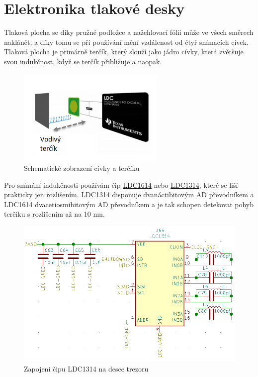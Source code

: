 \section{Elektronika tlakové desky}

Tlaková plocha se díky pružné podložce a nažehlovací fólii může ve všech směrech naklánět, a díky tomu se při používání mění vzdálenost od čtyř snímacích
cívek. Tlaková plocha je primárně terčík, který slouží jako jádro cívky, která zvětšuje svou indukčnost, když se terčík přibližuje a naopak.

\begin{figure}[htbp] %
    \centering
    \includegraphics[width=200pt]{kapitoly/obrazky/E4/elektronika_tlakove_desky/civka_tercik_LDC.png}
    \caption{Schematické zobrazení cívky a terčíku}
    \label{fig:E4-sch_civka_tercik}
\end{figure}

Pro snímání indukčnosti používám čip \href{https://www.ti.com/lit/ds/symlink/ldc1612.pdf?ts=1612018658531&ref_url=https%253A%252F%252Fwww.google.com%252F}{LDC1614}
nebo \href{https://www.ti.com/lit/ds/symlink/ldc1312.pdf?ts=1612017390818&ref_url=https%253A%252F%252Fwww.google.com%252F}{LDC1314}, 
které se liší prakticky jen rozlišením. LDC1314 disponuje dvanáctibitovým AD převodníkem a LDC1614 dvacetiosmibitovým AD převodníkem 
a je tak schopen detekovat pohyb terčíku s rozlišením až na 10 nm.

\begin{figure}[htbp]
    \centering
    \includegraphics[width=\textwidth]{kapitoly/obrazky/E4/elektronika_tlakove_desky/moje_zapojeni.png}
    \caption{Zapojení čipu LDC1314 na desce trezoru}
    \label{fig:E4-LDC}
\end{figure}

